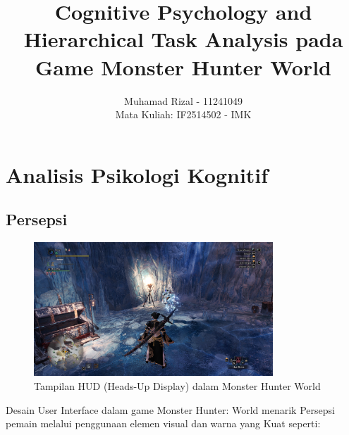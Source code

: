 \documentclass[12pt]{article}
\title{\textbf{Cognitive Psychology and Hierarchical Task Analysis
pada Game Monster Hunter World}}
\author{Muhamad Rizal - 11241049 \\
Mata Kuliah: IF2514502 - IMK}
\begin{document}
\maketitle

\section{Analisis Psikologi Kognitif}
\subsection{Persepsi}
\begin{figure}[h!]
    \centering
    \includegraphics[width=0.8\textwidth]{Image/Main_Secreenshots.png}
    \caption{Tampilan HUD (Heads-Up Display) dalam Monster Hunter World}\label{fig:hud}
\end{figure}
Desain User Interface dalam game Monster Hunter: World menarik Persepsi pemain melalui penggunaan elemen visual dan warna yang Kuat seperti:
\end{document}
